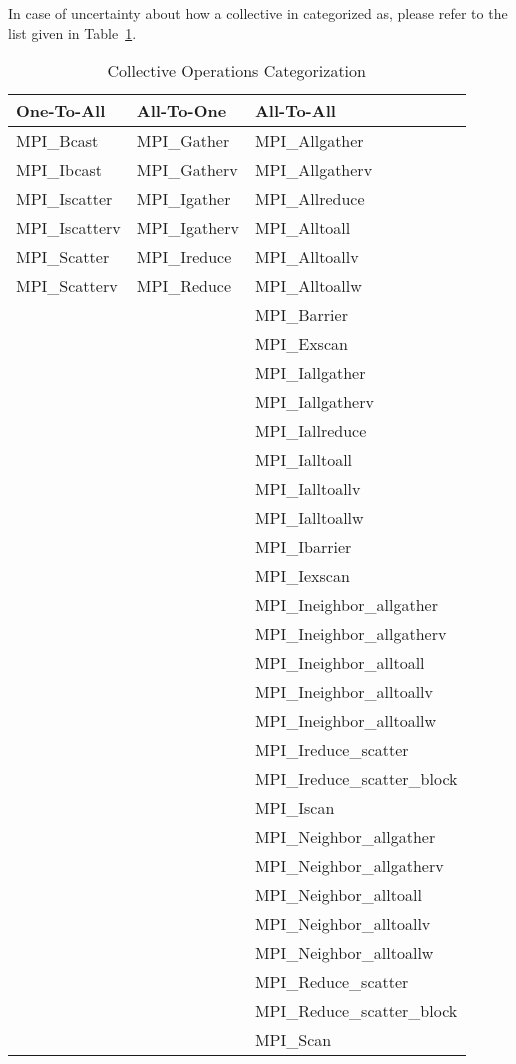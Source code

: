 \documentclass[notitlepage]{article}
\begin{document}
In case of uncertainty about how a collective in categorized as, please refer to the list given in Table~\ref{tab:coll-cat}.

\begin{table}
  \begin{center}
    \begin{tabular}{|l|l|l|}
      \hline
      One-To-All & All-To-One & All-To-All \\
      \hline
      MPI\_Bcast     & MPI\_Gather   & MPI\_Allgather \\
      MPI\_Ibcast    & MPI\_Gatherv  & MPI\_Allgatherv \\
      MPI\_Iscatter  & MPI\_Igather  & MPI\_Allreduce \\
      MPI\_Iscatterv & MPI\_Igatherv & MPI\_Alltoall \\
      MPI\_Scatter   & MPI\_Ireduce  & MPI\_Alltoallv \\
      MPI\_Scatterv  & MPI\_Reduce   & MPI\_Alltoallw \\
      && MPI\_Barrier \\
      && MPI\_Exscan \\
      && MPI\_Iallgather \\
      && MPI\_Iallgatherv \\
      && MPI\_Iallreduce \\
      && MPI\_Ialltoall \\
      && MPI\_Ialltoallv \\
      && MPI\_Ialltoallw \\
      && MPI\_Ibarrier \\
      && MPI\_Iexscan \\
      && MPI\_Ineighbor\_allgather \\
      && MPI\_Ineighbor\_allgatherv \\
      && MPI\_Ineighbor\_alltoall \\
      && MPI\_Ineighbor\_alltoallv \\
      && MPI\_Ineighbor\_alltoallw \\
      && MPI\_Ireduce\_scatter \\
      && MPI\_Ireduce\_scatter\_block \\
      && MPI\_Iscan \\
      && MPI\_Neighbor\_allgather \\
      && MPI\_Neighbor\_allgatherv \\
      && MPI\_Neighbor\_alltoall \\
      && MPI\_Neighbor\_alltoallv \\
      && MPI\_Neighbor\_alltoallw \\
      && MPI\_Reduce\_scatter \\
      && MPI\_Reduce\_scatter\_block \\
      && MPI\_Scan \\
      \hline
  \end{tabular}
\end{center}
  \caption{Collective Operations Categorization}
  \label{tab:coll-cat}
\end{table}
\end{document}
